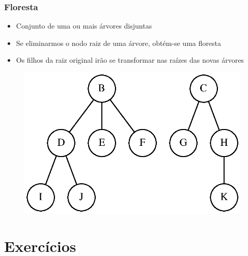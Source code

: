 \documentclass[aspectratio=169]{beamer}
\begin{document}
\begin{frame}\frametitle{Floresta}
\begin{itemize}
	\item Conjunto de uma ou mais árvores disjuntas
	\item Se eliminarmos o nodo raiz de uma árvore, obtém-se uma floresta
	\item Os filhos da raiz original irão se transformar nas raízes das novas árvores
\end{itemize}
\begin{figure}[h]
	\centering
	\includegraphics[height=0.5\paperheight]{imagens/floresta.eps}
\end{figure}
\end{frame}

\section{Exercícios}
\end{document}
